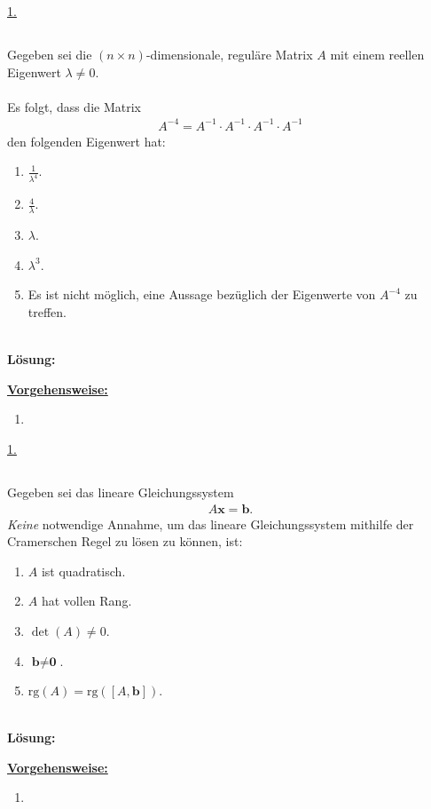 \underline{1. }\\

\newpage

\subsection*{}
Gegeben sei die $ (n \times n ) $-dimensionale, reguläre Matrix $ A $ mit einem reellen Eigenwert $ \lambda \neq 0 $.\\
\\
Es folgt, dass die Matrix
\begin{align*}
	A^{-4} = A^{-1} \cdot A^{-1} \cdot A^{-1} \cdot A^{-1}
\end{align*}
den folgenden Eigenwert hat:
\renewcommand{\labelenumi}{(\alph{enumi})}
\begin{enumerate}
	\item 
	$ \frac{1}{\lambda^4} $.
	\item 
	$ \frac{4}{\lambda} $.
	\item
	$ \lambda$.
	\item
	$\lambda^3 $.
	\item 
	Es ist nicht möglich, eine Aussage bezüglich der Eigenwerte von $ A^{-4} $ zu treffen.
\end{enumerate}
\ \\
\textbf{Lösung:}
\begin{mdframed}
\underline{\textbf{Vorgehensweise:}}
\renewcommand{\labelenumi}{\theenumi.}
\begin{enumerate}
\item 
\end{enumerate}
\end{mdframed}

\underline{1. }\\


\newpage
\subsection*{}
Gegeben sei das lineare Gleichungssystem
\begin{align*}
	A \textbf{x} = \textbf{b}.
\end{align*}
\textit{Keine} notwendige Annahme, um das lineare Gleichungssystem mithilfe der Cramerschen Regel zu lösen zu können, ist:
\renewcommand{\labelenumi}{(\alph{enumi})}
\begin{enumerate}
	\item 
	$ A $ ist quadratisch.
	\item
	$ A $ hat vollen Rang.
	\item
	$ \det(A) \neq 0$.
	\item
	$ \textbf{b} \neq \textbf{0} $.
	\item
	$ \mathrm{rg}(A) = \mathrm{rg}([A,\textbf{b}])$.
\end{enumerate}
\ \\
\textbf{Lösung:}
\begin{mdframed}
\underline{\textbf{Vorgehensweise:}}
\renewcommand{\labelenumi}{\theenumi.}
\begin{enumerate}
\item 
\end{enumerate}
\end{mdframed}

